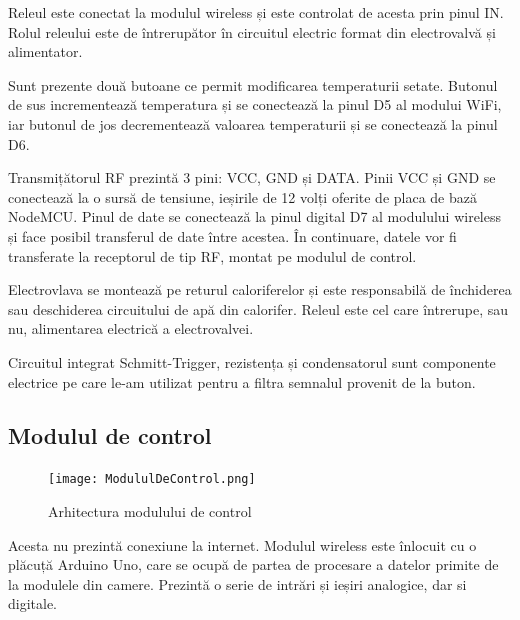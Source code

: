 \vspace{1em}

	Releul este conectat la modulul wireless și este controlat de acesta prin pinul IN. Rolul releului este de întrerupător în circuitul electric format din electrovalvă și alimentator.

\vspace{1em}

	Sunt prezente două butoane ce permit modificarea temperaturii setate. Butonul de sus incrementează temperatura și se conectează la pinul D5 al modului WiFi, iar butonul de jos decrementează valoarea temperaturii și se conectează la pinul D6.

\vspace{1em}

	Transmițătorul RF prezintă 3 pini: VCC, GND și DATA. Pinii VCC și GND se conectează la o sursă de tensiune, ieșirile de 12 volți oferite de placa de bază NodeMCU. Pinul de date se conectează la pinul digital D7 al modulului wireless și face posibil transferul de date între acestea. În continuare, datele vor fi transferate la receptorul de tip RF, montat pe modulul de control.  

\vspace{1em}

	Electrovlava se montează pe returul caloriferelor și este responsabilă de închiderea sau deschiderea circuitului de apă din calorifer. Releul este cel care întrerupe, sau nu, alimentarea electrică a electrovalvei.

\vspace{1em}

	Circuitul integrat Schmitt-Trigger, rezistența și condensatorul sunt componente electrice pe care le-am utilizat pentru a filtra semnalul provenit de la buton.  

\subsection{Modulul de control}

\begin{figure}[H]
   	\centering
    	\texttt{[image: ModululDeControl.png]}
	\caption{Arhitectura modulului de control}
\end{figure}

	Acesta nu prezintă conexiune la internet. Modulul wireless este înlocuit cu o plăcuță Arduino Uno, care se ocupă de partea de procesare a datelor primite de la modulele din camere. Prezintă o serie de intrări și ieșiri analogice, dar si digitale. 

